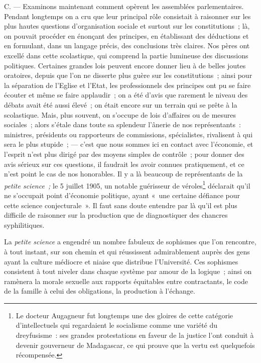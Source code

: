 \documentclass[french,twoside]{book} %
\begin{document}
\noindent C. — Examinons maintenant comment opèrent les assemblées parlementaires. Pendant longtemps on a cru que leur principal rôle consistait à raisonner sur les plus hautes questions d’organisation sociale et surtout sur les constitutions ; là, on pouvait procéder en énonçant des principes, en établissant des déductions et en formulant, dans un langage précis, des conclusions très claires. Nos pères ont excellé dans cette scolastique, qui comprend la partie lumineuse des discussions politiques.  Certaines grandes lois peuvent encore donner lieu à de belles joutes oratoires, depuis que l’on ne disserte plus guère sur les constitutions ; ainsi pour la séparation de l’Eglise et l’Etat, les professionnels des principes ont pu se faire écouter et même se faire applaudir ; on a été d’avis que rarement le niveau des débats avait été aussi élevé ; on était encore sur un terrain qui se prête à la scolastique. Mais, plus souvent, on s’occupe de lois d’affaires ou de mesures sociales ; alors s’étale dans toute sa splendeur l’ânerie de nos représentants : ministres, présidents ou rapporteurs de commissions, spécialistes, rivalisent à qui sera le plus stupide ; — c’est que nous sommes ici en contact avec l’économie, et l’esprit n’est plus dirigé par des moyens simples de contrôle ; pour donner des avis sérieux sur ces questions, il faudrait les avoir connues pratiquement, et ce n’est point le cas de nos honorables. Il y a là beaucoup de représentants de la \emph{petite science ;} le 5 juillet 1905, un notable guérisseur de véroles\footnote{ \noindent Le docteur Augagneur fut longtemps une des gloires de cette catégorie d’intellectuels qui regardaient le socialisme comme une variété du dreyfusisme : ses grandes protestations en faveur de la justice l’ont conduit à devenir gouverneur de Madagascar, ce qui prouve que la vertu est quelquefois récompensée.
 } déclarait qu’il ne s’occupait point d’économie politique, ayant « une certaine défiance pour cette science conjecturale ». Il faut sans doute entendre par là qu’il est plus difficile de raisonner sur la production que de diagnostiquer des chancres syphilitiques.\par
La \emph{petite science} a engendré un nombre fabuleux de  sophismes que l’on rencontre, à tout instant, sur son chemin et qui réussissent admirablement auprès des gens ayant la culture médiocre et niaise que distribue l’Université. Ces sophismes consistent à tout niveler dans chaque système par amour de la logique ; ainsi on ramènera la morale sexuelle aux rapports équitables entre contractants, le code de la famille à celui des obligations, la production à l’échange.\par
\end{document}
